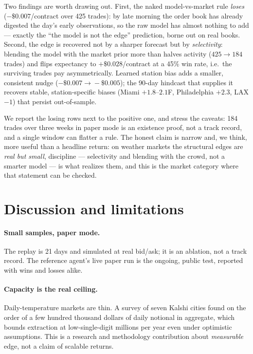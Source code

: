 \documentclass[sigconf,review,anonymous]{acmart}
\begin{document}
Two findings are worth drawing out. First, the naked model-vs-market rule
\emph{loses} ($-\$0.007$/contract over 425 trades): by late morning the order book
has already digested the day's early observations, so the raw model has almost
nothing to add --- exactly the ``the model is not the edge'' prediction, borne out
on real books. Second, the edge is recovered not by a sharper forecast but by
\emph{selectivity}: blending the model with the market prior more than halves
activity ($425\!\to\!184$ trades) and flips expectancy to $+\$0.028$/contract at a
45\% win rate, i.e.\ the surviving trades pay asymmetrically. Learned station bias
adds a smaller, consistent nudge ($-\$0.007\!\to\!-\$0.005$); the 90-day hindcast
that supplies it recovers stable, station-specific biases (Miami
$+1.8$--$2.1$\textdegree{}F, Philadelphia $+2.3$, LAX $-1$) that persist
out-of-sample.

We report the losing rows next to the positive one, and stress the caveats: 184
trades over three weeks in paper mode is an existence proof, not a track record,
and a single window can flatter a rule. The honest claim is narrow and, we think,
more useful than a headline return: on weather markets the structural edges are
\emph{real but small}, discipline --- selectivity and blending with the crowd, not
a smarter model --- is what realizes them, and this is the market category where
that statement can be checked.

\section{Discussion and limitations}

\paragraph{Small samples, paper mode.} The replay is 21 days and simulated at real
bid/ask; it is an ablation, not a track record. The reference agent's live paper
run is the ongoing, public test, reported with wins and losses alike.

\paragraph{Capacity is the real ceiling.} Daily-temperature markets are thin. A
survey of seven Kalshi cities found on the order of a few hundred thousand dollars
of daily notional in aggregate, which bounds extraction at low-single-digit
millions per year even under optimistic assumptions. This is a research and
methodology contribution about \emph{measurable} edge, not a claim of scalable
returns.
\end{document}
